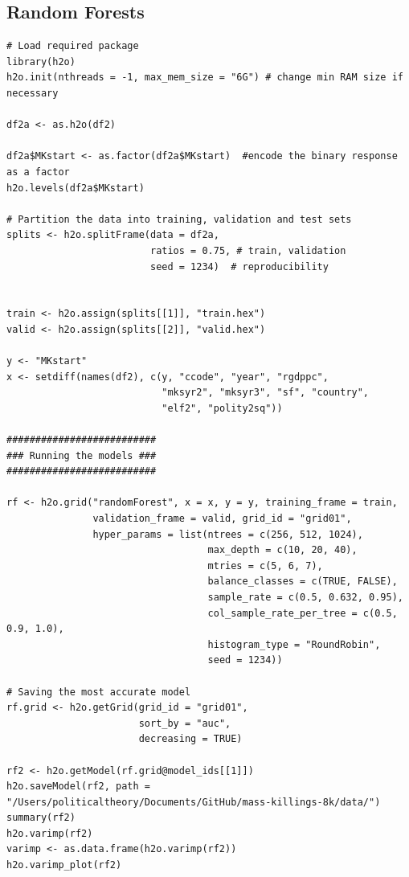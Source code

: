 \documentclass[a4paper,12pt]{article}
\begin{document}
\newpage

\normalsize

\subsection{Random Forests}

\scriptsize

\begin{verbatim}
# Load required package
library(h2o)
h2o.init(nthreads = -1, max_mem_size = "6G") # change min RAM size if necessary

df2a <- as.h2o(df2)

df2a$MKstart <- as.factor(df2a$MKstart)  #encode the binary response as a factor
h2o.levels(df2a$MKstart)

# Partition the data into training, validation and test sets
splits <- h2o.splitFrame(data = df2a, 
                         ratios = 0.75, # train, validation
                         seed = 1234)  # reproducibility


train <- h2o.assign(splits[[1]], "train.hex")   
valid <- h2o.assign(splits[[2]], "valid.hex") 

y <- "MKstart"
x <- setdiff(names(df2), c(y, "ccode", "year", "rgdppc",
                           "mksyr2", "mksyr3", "sf", "country",
                           "elf2", "polity2sq")) 

##########################
### Running the models ###
##########################

rf <- h2o.grid("randomForest", x = x, y = y, training_frame = train, 
               validation_frame = valid, grid_id = "grid01",
               hyper_params = list(ntrees = c(256, 512, 1024),
                                   max_depth = c(10, 20, 40),
                                   mtries = c(5, 6, 7),
                                   balance_classes = c(TRUE, FALSE),
                                   sample_rate = c(0.5, 0.632, 0.95),
                                   col_sample_rate_per_tree = c(0.5, 0.9, 1.0),
                                   histogram_type = "RoundRobin",
                                   seed = 1234)) 

# Saving the most accurate model
rf.grid <- h2o.getGrid(grid_id = "grid01",
                       sort_by = "auc",
                       decreasing = TRUE)

rf2 <- h2o.getModel(rf.grid@model_ids[[1]])
h2o.saveModel(rf2, path = "/Users/politicaltheory/Documents/GitHub/mass-killings-8k/data/")
summary(rf2)
h2o.varimp(rf2)
varimp <- as.data.frame(h2o.varimp(rf2))
h2o.varimp_plot(rf2)


\end{verbatim}
\end{document}
